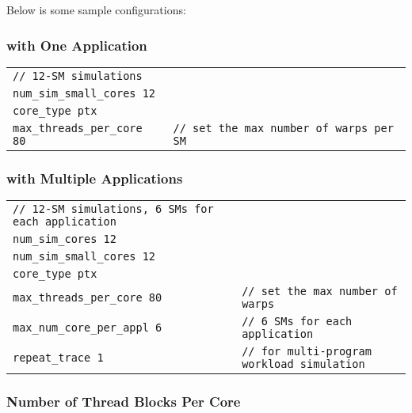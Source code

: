 \noindent Below is some sample configurations:

\subsubsection*{\gpu with One Application}

\begin{tabular}{l l}
 \Verb+// 12-SM simulations+ & \Verb++ \\
 \Verb+num_sim_small_cores 12+ & \Verb++ \\
 \Verb+core_type ptx+ & \Verb++ \\
 \Verb+max_threads_per_core 80+ & \Verb+// set the max number of warps per SM+
\end{tabular}

\subsubsection*{\gpu with Multiple Applications}

\begin{tabular}{l l}
 \Verb+// 12-SM simulations, 6 SMs for each application+ & \Verb++ \\
 \Verb+num_sim_cores 12+ & \Verb++ \\
 \Verb+num_sim_small_cores 12+ & \Verb++ \\
 \Verb+core_type ptx+ & \Verb++ \\
 \Verb+max_threads_per_core 80+ & \Verb+// set the max number of warps + \\
 \Verb+max_num_core_per_appl 6+ & \Verb+// 6 SMs for each application+ \\
 \Verb+repeat_trace 1+ & \Verb+// for multi-program workload simulation+
\end{tabular}

\subsubsection{Number of Thread Blocks Per Core}

